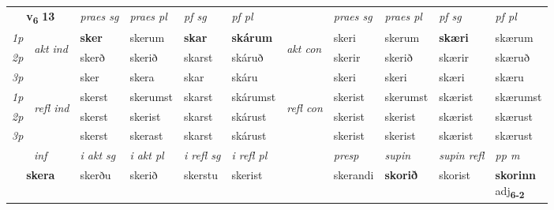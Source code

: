 \noindent
\begin{tabular}{lllllllllll} \toprule
\multicolumn{2}{c}{\textbf{v{\textsubscript{6}}} \Large{\textbf{13}}}  &  \textit{praes sg}  & \textit{praes pl}  &\textit{ pf sg} & \textit{pf pl} &  &  \textit{praes sg}  & \textit{praes pl}  & \textit{pf sg} & \textit{pf pl } \\*
	\cmidrule{3-6} \cmidrule{8-11}
 {\textit{1p}} & \multirow{3}{*}{\begin{turn}{90}\textit{akt ind}\end{turn}} & \textbf{sker} & skerum & \textbf{skar} & \textbf{skárum} & \multirow{3}{*}{\begin{turn}{90}\textit{akt con}\end{turn}} &skeri & skerum & \textbf{skæri} & skærum\\*
 {\textit{2p}} &  &  skerð  & skerið & skarst & skáruð & & skerir & skerið & skærir & skæruð \\*
{\textit{3p}} &  & sker & skera & skar & skáru & & skeri & skeri& skæri & skæru \\*
\cmidrule{3-6} \cmidrule{8-11}
 {\textit{1p}} & \multirow{3}{*}{\begin{turn}{90}\textit{refl ind}\end{turn}}  & skerst & skerumst & skarst & skárumst & \multirow{3}{*}{\begin{turn}{90}\textit{refl con}\end{turn}}  &skerist & skerumst & skærist & skærumst \\*
 {\textit{2p}} &  & skerst & skerist & skarst & skárust & &skerist & skerist & skærist & skærust \\*
 {\textit{3p}}  & & skerst & skerast & skarst & skárust & & skerist & skerist& skærist & skærust \\*
\cmidrule{3-6} \cmidrule{8-11}

   \multicolumn{2}{c}{\textit{inf}}  & \textit{i akt sg} & \textit{i akt pl} & \textit{i refl sg} & \textit{i refl pl} && \textit{presp} & \textit{supin} & \textit{supin refl} & \textit{pp m} \\*
  \multicolumn{2}{c}{\textbf{skera}} & skerðu  & skerið & skerstu & skerist && skerandi &  \textbf{skorið} & skorist & \specialcell{\textbf{skorinn} \\ adj\textbf{\textsubscript{6-2}}} \\*
\end{tabular}

